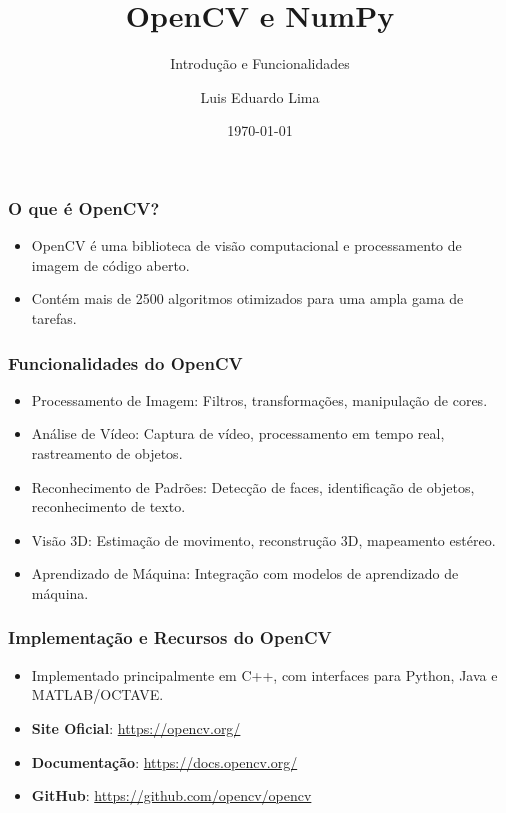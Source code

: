 \documentclass{beamer}
\begin{document}
\begin{frame}
    \title{OpenCV e NumPy}
    \subtitle{Introdução e Funcionalidades}
    \author{Luis Eduardo Lima}
    \date{\today}
    \titlepage
\end{frame}

\begin{frame}
    \frametitle{O que é OpenCV?}
    \begin{itemize}
        \item OpenCV é uma biblioteca de visão computacional e processamento de imagem de código aberto.
        \item Contém mais de 2500 algoritmos otimizados para uma ampla gama de tarefas.
    \end{itemize}
\end{frame}

\begin{frame}
    \frametitle{Funcionalidades do OpenCV}
    \begin{itemize}
        \item Processamento de Imagem: Filtros, transformações, manipulação de cores.
        \item Análise de Vídeo: Captura de vídeo, processamento em tempo real, rastreamento de objetos.
        \item Reconhecimento de Padrões: Detecção de faces, identificação de objetos, reconhecimento de texto.
        \item Visão 3D: Estimação de movimento, reconstrução 3D, mapeamento estéreo.
        \item Aprendizado de Máquina: Integração com modelos de aprendizado de máquina.
    \end{itemize}
\end{frame}

\begin{frame}
    \frametitle{Implementação e Recursos do OpenCV}
    \begin{itemize}
        \item Implementado principalmente em C++, com interfaces para Python, Java e MATLAB/OCTAVE.
        \item \textbf{Site Oficial}: \url{https://opencv.org/}
        \item \textbf{Documentação}: \url{https://docs.opencv.org/}
        \item \textbf{GitHub}: \url{https://github.com/opencv/opencv}
    \end{itemize}
\end{frame}
\end{document}
